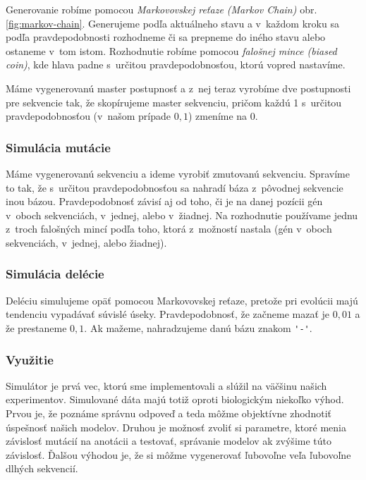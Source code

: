 Generovanie robíme pomocou \textit{Markovovskej reťaze (Markov Chain)} obr. \ref{fig:markov-chain}. Generujeme podľa aktuálneho stavu a v~každom kroku sa podľa pravdepodobnosti rozhodneme či sa prepneme do iného stavu alebo ostaneme v~tom istom. Rozhodnutie robíme pomocou \textit{falošnej mince (biased coin)}, kde hlava padne s~určitou pravdepodobnosťou, ktorú vopred nastavíme.


Máme vygenerovanú master postupnosť a z~nej teraz vyrobíme dve postupnosti pre sekvencie tak, že skopírujeme master sekvenciu, pričom každú 1 s~určitou pravdepodobnosťou (v~našom prípade $0,1$) zmeníme na 0.

\subsubsection{Simulácia mutácie}

Máme vygenerovanú sekvenciu a ideme vyrobiť zmutovanú sekvenciu. Spravíme to tak, že s~určitou pravdepodobnosťou sa nahradí báza z~pôvodnej sekvencie inou bázou. Pravdepodobnosť závisí aj od toho, či je na danej pozícii gén v~oboch sekvenciách, v~jednej, alebo v~žiadnej. Na rozhodnutie používame jednu z~troch falošných mincí podľa toho, ktorá z~možností nastala (gén v~oboch sekvenciách, v~jednej, alebo žiadnej).

\subsubsection{Simulácia delécie}
Deléciu simulujeme opäť pomocou Markovovskej reťaze, pretože pri evolúcii majú tendenciu vypadávať súvislé úseky. Pravdepodobnosť, že začneme mazať je $0,01$ a že prestaneme $0,1$.
Ak mažeme, nahradzujeme danú bázu znakom {\verb+'-'+}.

\subsubsection{Využitie}

Simulátor je prvá vec, ktorú sme implementovali a slúžil na väčšinu našich experimentov. Simulované dáta majú totiž oproti biologickým niekoľko výhod. Prvou je, že poznáme správnu odpoveď a teda môžme objektívne zhodnotiť úspešnosť našich modelov. Druhou je možnosť zvoliť si parametre, ktoré menia závislosť mutácií na anotácii a testovať, správanie modelov ak zvýšime túto závislosť. Ďalšou výhodou je, že si môžme vygenerovať ľubovoľne veľa ľubovoľne dlhých sekvencií.

